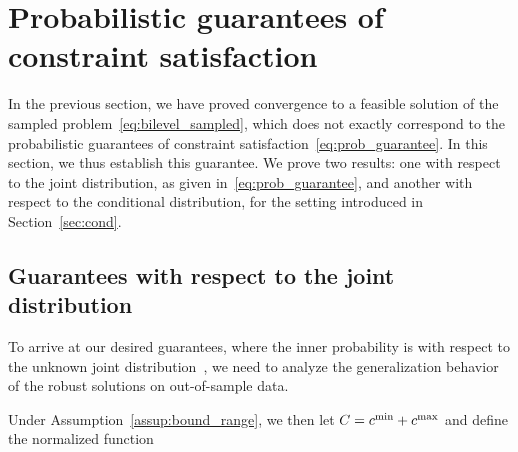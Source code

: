 \section{Probabilistic guarantees of constraint satisfaction}
\label{sec:guarantees}
In the previous section, we have proved convergence to a feasible solution of the sampled problem~\eqref{eq:bilevel_sampled}, which does not exactly correspond to the probabilistic guarantees of constraint satisfaction~\eqref{eq:prob_guarantee}. 
In this section, we thus establish this guarantee. We prove two results: one with respect to the joint distribution, as given in~\eqref{eq:prob_guarantee}, and another with respect to the conditional distribution, for the setting introduced in Section~\ref{sec:cond}.

\subsection{Guarantees with respect to the joint distribution}
To arrive at our desired guarantees, where the inner probability is with respect to the unknown joint distribution~, we need to analyze the generalization behavior of the robust solutions on out-of-sample data. 
\begin{assumption}
  \label{assup:bound_range} 
\end{assumption}
Under Assumption~\ref{assup:bound_range}, we then let $C = c^{\rm min} + c^{\rm max}$ and define the normalized function
